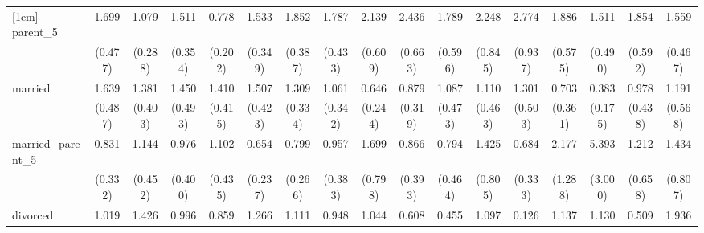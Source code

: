 {\begin{tabular}{l*{16}{c}}
[1em]
parent\_5            &       1.699         &       1.079         &       1.511         &       0.778         &       1.533         &       1.852\sym{**} &       1.787\sym{*}  &       2.139\sym{**} &       2.436\sym{**} &       1.789         &       2.248\sym{*}  &       2.774\sym{**} &       1.886\sym{*}  &       1.511         &       1.854         &       1.559         \\
                    &     (0.477)         &     (0.288)         &     (0.354)         &     (0.202)         &     (0.349)         &     (0.387)         &     (0.433)         &     (0.609)         &     (0.663)         &     (0.596)         &     (0.845)         &     (0.937)         &     (0.575)         &     (0.490)         &     (0.592)         &     (0.467)         \\
[1em]
married             &       1.639         &       1.381         &       1.450         &       1.410         &       1.507         &       1.309         &       1.061         &       0.646         &       0.879         &       1.087         &       1.110         &       1.301         &       0.703         &       0.383\sym{*}  &       0.978         &       1.191         \\
                    &     (0.487)         &     (0.403)         &     (0.493)         &     (0.415)         &     (0.423)         &     (0.334)         &     (0.342)         &     (0.244)         &     (0.319)         &     (0.473)         &     (0.463)         &     (0.503)         &     (0.361)         &     (0.175)         &     (0.438)         &     (0.568)         \\
[1em]
married\_parent\_5    &       0.831         &       1.144         &       0.976         &       1.102         &       0.654         &       0.799         &       0.957         &       1.699         &       0.866         &       0.794         &       1.425         &       0.684         &       2.177         &       5.393\sym{**} &       1.212         &       1.434         \\
                    &     (0.332)         &     (0.452)         &     (0.400)         &     (0.435)         &     (0.237)         &     (0.266)         &     (0.383)         &     (0.798)         &     (0.393)         &     (0.464)         &     (0.805)         &     (0.333)         &     (1.288)         &     (3.000)         &     (0.658)         &     (0.807)         \\
[1em]
divorced            &       1.019         &       1.426         &       0.996         &       0.859         &       1.266         &       1.111         &       0.948         &       1.044         &       0.608         &       0.455         &       1.097         &       0.126\sym{*}  &       1.137         &       1.130         &       0.509         &       1.936         \\

\end{tabular}}
